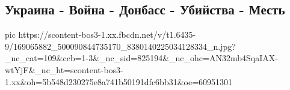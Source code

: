  
 
 
 
 
\subsection{Украина - Война - Донбасс - Убийства - Месть}
\label{sec:07_04_2021.fb.lnrgumo.2.ukraina_vojna_mestj}

\ifcmt
  pic https://scontent-bos3-1.xx.fbcdn.net/v/t1.6435-9/169065882_500090844735170_8380140225034128334_n.jpg?_nc_cat=109&ccb=1-3&_nc_sid=825194&_nc_ohc=AN32mb4SqaIAX-wtYjF&_nc_ht=scontent-bos3-1.xx&oh=5b548d230275e8a741b50191dfc6bb31&oe=60951301
\fi
